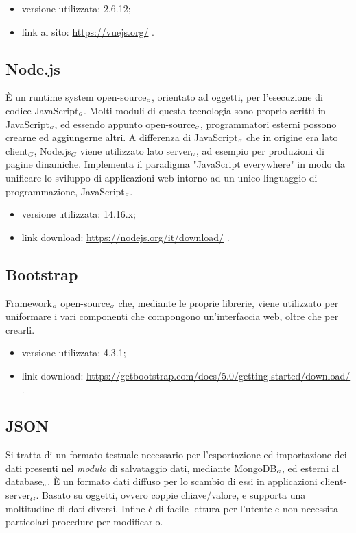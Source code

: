 \begin{itemize}
  \item versione utilizzata: 2.6.12;
  \item link al sito: \url{https://vuejs.org/} .
\end{itemize}

\subsection{Node.js}\label{TecnologieNode}
È un runtime system open-source$_{\scaleto{G}{3pt}}$, orientato ad oggetti, per l'esecuzione di codice JavaScript$_{\scaleto{G}{3pt}}$.
Molti moduli di questa tecnologia sono proprio scritti in JavaScript$_{\scaleto{G}{3pt}}$, ed essendo appunto open-source$_{\scaleto{G}{3pt}}$, programmatori esterni possono crearne ed aggiungerne altri.
A differenza di JavaScript$_{\scaleto{G}{3pt}}$ che in origine era lato client$_G$, Node.js$_G$ viene utilizzato lato server$_{\scaleto{G}{3pt}}$, ad esempio per produzioni di pagine dinamiche.
Implementa il paradigma "JavaScript everywhere" in modo da unificare lo sviluppo di applicazioni web intorno ad un unico linguaggio di programmazione, JavaScript$_{\scaleto{G}{3pt}}$.

\begin{itemize}
  \item versione utilizzata: 14.16.x;
  \item link download: \url{https://nodejs.org/it/download/} .
\end{itemize}

\subsection{Bootstrap}\label{TecnologieBootstrap}
Framework$_{\scaleto{G}{3pt}}$ open-source$_{\scaleto{G}{3pt}}$ che, mediante le proprie librerie, viene utilizzato per uniformare i vari componenti che compongono un'interfaccia web, oltre che per crearli.

\begin{itemize}
  \item versione utilizzata: 4.3.1;
  \item link download: \url{https://getbootstrap.com/docs/5.0/getting-started/download/} .
\end{itemize}


\subsection{JSON}\label{TecnologieJson}
Si tratta di un formato testuale necessario per l'esportazione ed importazione dei dati presenti nel \textit{modulo} di salvataggio dati, mediante MongoDB$_{\scaleto{G}{3pt}}$, ed esterni al database$_{\scaleto{G}{3pt}}$.
È un formato dati diffuso per lo scambio di essi in applicazioni client-server$_G$.
Basato su oggetti, ovvero coppie chiave/valore, e supporta una moltitudine di dati diversi. Infine è di facile lettura per l'utente e non necessita particolari procedure per modificarlo.



